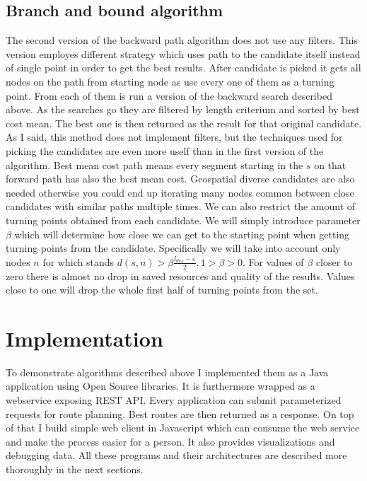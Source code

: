 \documentclass{ctuthesis}
\begin{document}
\section{Branch and bound algorithm}
The second version of the backward path algorithm does not use any filters. This version employes different strategy which uses path to the candidate itself instead of single point in order to get the best results. After candidate is picked it gets all nodes on the path from starting node as use every one of them as a turning point. From each of them is run a version of the backward search described above. As the searches go they are filtered by length criterium and sorted by best cost mean. The best one is then returned as the result for that original candidate.
As I said, this method does not implement filters, but the techniques used for picking the candidates are even more uself than in the first version of the algorithm. Best mean cost path means every segment starting in the \(s\) on that forward path has also the best mean cost. Geospatial diverse candidates are also needed otherwise you could end up iterating many nodes common between close candidates with similar paths multiple times.
We can also restrict the amount of turning points obtained from each candidate. We will simply introduce parameter \(\beta\) which will determine how close we can get to the starting point when getting turning points from the candidate. Specifically we will take into account only nodes \(n\) for which stands \(d(s, n) > \beta\frac {l_{des}-\varepsilon} 2, 1 > \beta > 0\). For values of \(\beta\) closer to zero there is almost no drop in saved resources and quality of the results. Values close to one will drop the whole first half of turning points from the set. 


\chapter{Implementation}
To demonstrate algorithms described above I implemented them as a Java application using Open Source libraries. It is furthermore wrapped as a webservice exposing REST API. Every application can submit parameterized requests for route planning. Best routes are then returned as a response. On top of that I build simple web client in Javascript which can consume the web service and make the process easier for a person. It also provides visualizations and debugging data. All these programs and their architectures are described more thoroughly in the next sections.
\end{document}
